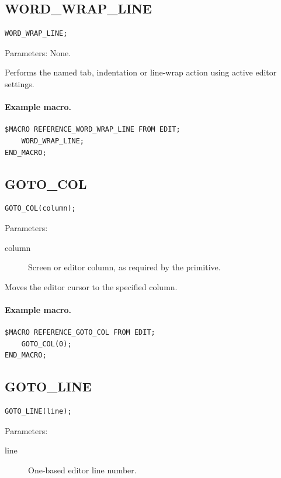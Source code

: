 \documentclass[a4paper,10pt,twoside,openany]{book}
\begin{document}
\label{prim:procedure-word-wrap-line}
\subsection*{WORD\_WRAP\_LINE}
\begin{verbatim}
WORD_WRAP_LINE;
\end{verbatim}
Parameters: None.

Performs the named tab, indentation or line-wrap action using active editor settings.

\paragraph{Example macro.}
\begin{verbatim}
$MACRO REFERENCE_WORD_WRAP_LINE FROM EDIT;
    WORD_WRAP_LINE;
END_MACRO;
\end{verbatim}

\label{prim:procedure-goto-col}
\subsection*{GOTO\_COL}
\begin{verbatim}
GOTO_COL(column);
\end{verbatim}
Parameters:
\begin{description}
\item[column] Screen or editor column, as required by the primitive.
\end{description}

Moves the editor cursor to the specified column.

\paragraph{Example macro.}
\begin{verbatim}
$MACRO REFERENCE_GOTO_COL FROM EDIT;
    GOTO_COL(0);
END_MACRO;
\end{verbatim}

\label{prim:procedure-goto-line}
\subsection*{GOTO\_LINE}
\begin{verbatim}
GOTO_LINE(line);
\end{verbatim}
Parameters:
\begin{description}
\item[line] One-based editor line number.
\end{description}
\end{document}
